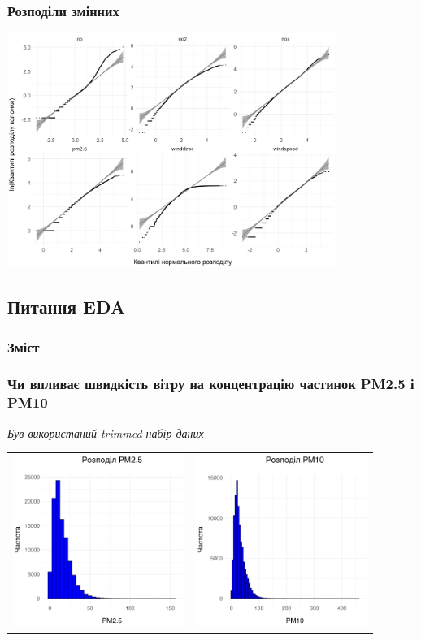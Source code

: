 \documentclass{beamer}
\begin{document}
\begin{frame}
  \frametitle{Розподіли змінних}

  \begin{center}
    \includegraphics[height=3in]{plots/qq_tidy/qq-log-p2.png}
  \end{center}
\end{frame}

\begin{frame}
  \section{Питання EDA}

  \frametitle{Зміст}
  \tableofcontents[currentsection]
\end{frame}


\begin{frame}
  \frametitle{Чи впливає швидкість вітру на концентрацію частинок PM2.5 і PM10}

  \quad \textit{Був використаний trimmed набір даних}

  \begin{tabular}{cc}
    \includegraphics[height=2.2in]{plots/question1/pm2_5_gist.png} &
    \includegraphics[height=2.2in]{plots/question1/pm10_gist.png}
  \end{tabular}
\end{frame}
\end{document}

